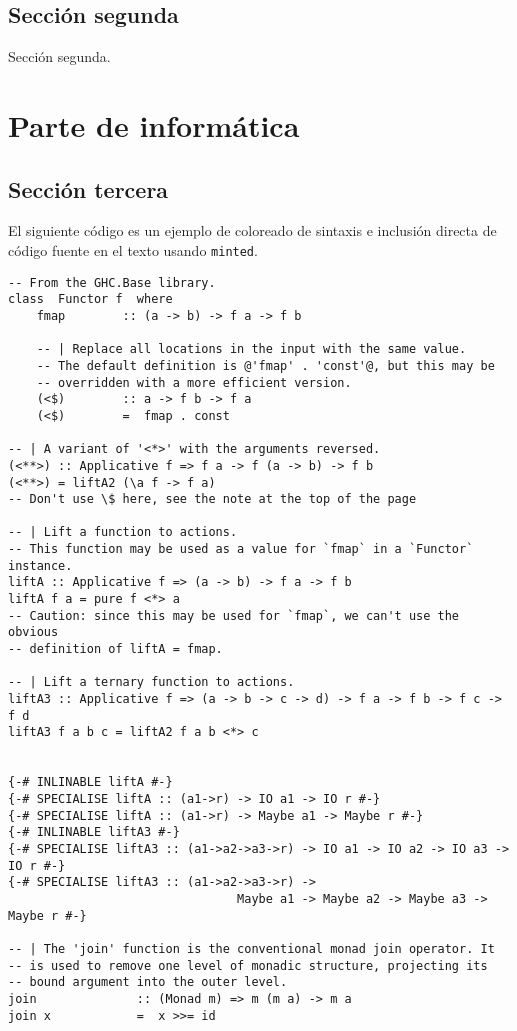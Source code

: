 \documentclass[oneside,openright,titlepage,numbers=noenddot,openany,headinclude,footinclude=true,
cleardoublepage=empty,abstractoff,BCOR=5mm,paper=a4,fontsize=12pt,main=spanish]{scrreprt}
\begin{document}
\chapter{Sección segunda}

Sección segunda.


\part{Parte de informática}
\chapter{Sección tercera}
El siguiente código es un ejemplo de coloreado de sintaxis e inclusión
directa de código fuente en el texto usando \texttt{minted}.

\begin{verbatim}
-- From the GHC.Base library.
class  Functor f  where
    fmap        :: (a -> b) -> f a -> f b

    -- | Replace all locations in the input with the same value.
    -- The default definition is @'fmap' . 'const'@, but this may be
    -- overridden with a more efficient version.
    (<$)        :: a -> f b -> f a
    (<$)        =  fmap . const

-- | A variant of '<*>' with the arguments reversed.
(<**>) :: Applicative f => f a -> f (a -> b) -> f b
(<**>) = liftA2 (\a f -> f a)
-- Don't use \$ here, see the note at the top of the page

-- | Lift a function to actions.
-- This function may be used as a value for `fmap` in a `Functor` instance.
liftA :: Applicative f => (a -> b) -> f a -> f b
liftA f a = pure f <*> a
-- Caution: since this may be used for `fmap`, we can't use the obvious
-- definition of liftA = fmap.

-- | Lift a ternary function to actions.
liftA3 :: Applicative f => (a -> b -> c -> d) -> f a -> f b -> f c -> f d
liftA3 f a b c = liftA2 f a b <*> c


{-# INLINABLE liftA #-}
{-# SPECIALISE liftA :: (a1->r) -> IO a1 -> IO r #-}
{-# SPECIALISE liftA :: (a1->r) -> Maybe a1 -> Maybe r #-}
{-# INLINABLE liftA3 #-}
{-# SPECIALISE liftA3 :: (a1->a2->a3->r) -> IO a1 -> IO a2 -> IO a3 -> IO r #-}
{-# SPECIALISE liftA3 :: (a1->a2->a3->r) ->
                                Maybe a1 -> Maybe a2 -> Maybe a3 -> Maybe r #-}

-- | The 'join' function is the conventional monad join operator. It
-- is used to remove one level of monadic structure, projecting its
-- bound argument into the outer level.
join              :: (Monad m) => m (m a) -> m a
join x            =  x >>= id
\end{verbatim}
\end{document}
